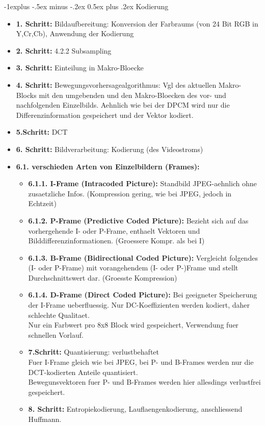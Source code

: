 \documentclass[10pt,landscape]{article}
\makeatletter
\renewcommand{\subsection}{\@startsection{subsection}{2}{0mm}%
                                {-1explus -.5ex minus -.2ex}%
                                {0.5ex plus .2ex}%
                                {\normalfont\normalsize\bfseries}}
\makeatother
\begin{document}
\begin{multicols}{3}
\subsection{Kodierung}
\begin{itemize}
    \item \textbf{1. Schritt:} Bildaufbereitung: Konversion der Farbraums (von 24 Bit RGB in Y,Cr,Cb), Anwendung der Kodierung
    \item \textbf{2. Schritt:} 4.2.2 Subsampling
    \item \textbf{3. Schritt:} Einteilung in Makro-Bloecke
    \item \textbf{4. Schritt:} Bewegungsvorhersagealgorithmus: Vgl des aktuellen Makro-Blocks mit den umgebenden und den Makro-Bloecken des vor- und nachfolgenden Einzelbilds. Aehnlich wie bei der DPCM wird nur die Differenzinformation gespeichert und der Vektor kodiert.
    \item \textbf{5.Schritt:} DCT
    \item \textbf{6. Schritt:} Bildverarbeitung: Kodierung (des Videostroms)
    \item \textbf{6.1. verschieden Arten von Einzelbildern (Frames):}
    \begin{itemize}
        \item \textbf{6.1.1. I-Frame (Intracoded Picture):}
            Standbild JPEG-aehnlich ohne zusaetzliche Infos. (Kompression gering, wie bei JPEG, jedoch in Echtzeit)
        \item \textbf{6.1.2. P-Frame (Predictive Coded Picture):}
            Bezieht sich auf das vorhergehende I- oder P-Frame, enthaelt Vektoren und Bilddifferenzinformationen. (Groessere Kompr. als bei I)
        \item \textbf{6.1.3. B-Frame (Bidirectional Coded Picture):}
            Vergleicht folgendes (I- oder P-Frame) mit vorangehendem (I- oder P-)Frame und stellt Durchschnittswert dar. (Groesste Kompression)
        \item \textbf{6.1.4. D-Frame (Direct Coded Picture):}
            Bei geeigneter Speicherung der I-Frame ueberfluessig. Nur DC-Koeffizienten werden kodiert, daher schlechte Qualitaet.\\
            Nur ein Farbwert pro 8x8 Block wird gespeichert, Verwendung fuer schnellen Vorlauf.
        \item \textbf{7.Schritt:} Quantisierung: verlustbehaftet\\
            Fuer I-Frame gleich wie bei JPEG, bei P- und B-Frames werden nur die DCT-kodierten Anteile quantisiert.\\
            Bewegunsvektoren fuer P- und B-Frames werden hier allesdings verlustfrei gespeichert.
        \item \textbf{8. Schritt:} Entropiekodierung, Lauflaengenkodierung, anschliessend Huffmann.
    \end{itemize}
\end{itemize}


\end{multicols}
\end{document}
